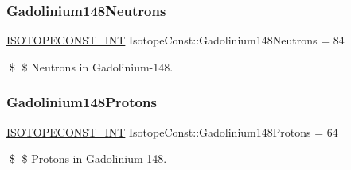 \subsubsection{\texorpdfstring{Gadolinium148\+Neutrons}{Gadolinium148Neutrons}}
{\footnotesize\ttfamily \mbox{\hyperlink{group___isotope_const-_macros_ga5f18360b3e99483a35c32d789e62621c}{I\+S\+O\+T\+O\+P\+E\+C\+O\+N\+S\+T\+\_\+\+I\+NT}} Isotope\+Const\+::\+Gadolinium148\+Neutrons = 84}

\$ \$ Neutrons in Gadolinium-\/148. \mbox{\label{group___isotope_const-_gadolinium-_gd148_ga6fc5c28b27430aca9d94c29558253c90}} 
\subsubsection{\texorpdfstring{Gadolinium148\+Protons}{Gadolinium148Protons}}
{\footnotesize\ttfamily \mbox{\hyperlink{group___isotope_const-_macros_ga5f18360b3e99483a35c32d789e62621c}{I\+S\+O\+T\+O\+P\+E\+C\+O\+N\+S\+T\+\_\+\+I\+NT}} Isotope\+Const\+::\+Gadolinium148\+Protons = 64}

\$ \$ Protons in Gadolinium-\/148. 